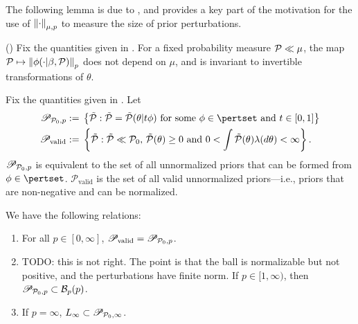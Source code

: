 The following lemma is due to \citep{gustafson:1996:local}, and provides
a key part of the motivation for the use of $\left\Vert\cdot\right\Vert_{\mu,p}$ to measure
the size of prior perturbations.

\begin{lem}
%
(\citet{gustafson:1996:local})
%
Fix the quantities given in .  For a fixed probability
measure $\mathcal{P} \ll \mu$, the map $\mathcal{P} \mapsto \left\Vert\phi(\cdot \vert \beta,
\mathcal{P})\right\Vert_p$ does not depend on $\mu$, and is invariant to invertible transformations
of $\theta$.
%
%
\end{lem}





\begin{lem}
%
Fix the quantities given in .  Let
%
\begin{align*}
%
\mathscr{P}_{\pbase,p} :={}&
    \left\{ \ptil: \ptil = \ptil(\theta \vert \t \phi) \textrm{ for some }
        \phi \in \pertset \textrm{ and } \t \in [0, 1]
    \right\} \\
\mathscr{P}_{\mathrm{valid}} :={}&
    \left\{ \ptil:
        \ptil \ll \pbase \textrm{, }
        \ptil(\theta) \ge 0 \textrm{ and }
        0 < \int \ptil(\theta) \lambda(d\theta) < \infty
    \right\}.
%
\end{align*}
%
$\mathscr{P}_{\mathcal{P}_{0},p}$ is equivalent to the set of all unnormalized priors
that can be formed from $\phi \in \pertset$.  $\mathscr{P}_{\mathrm{valid}}$ is
the set of all valid unnormalized priors---i.e., priors that are non-negative
and can be normalized.

We have the following relations:
%
\begin{enumerate}
%
    \item {}
    For all $p \in [0, \infty]$,
    $\mathscr{P}_{\mathrm{valid}} = \mathscr{P}_{\mathcal{P}_{0},p}$.
%
    \item {}
    TODO: this is not right.  The point is that the ball is normalizable
    but not positive, and the perturbations have finite norm.
    If $p \in [1, \infty)$, then $\mathscr{P}_{\mathcal{P}_{0},p} \subset \mathcal{B}_{p}(p)$.
%
    \item {}
    If $p = \infty$, ${L_{\infty}} \subset \mathscr{P}_{\mathcal{P}_{0},\infty}$.
%
\end{enumerate}
%
%
\end{lem}


